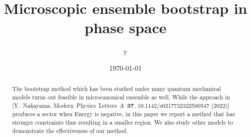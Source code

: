 \documentclass[aps,prl, preprint,amsmath, amssymb]{revtex4-2}
\begin{document}

\title{Microscopic ensemble bootstrap in phase space}


\author{y}


\date{\today}

\begin{abstract}
    The bootstrap method which has been studied under many quantum mechanical models turns out feasible in microcanonical ensemble as well. While the approach in [Y.\ Nakayama, Modern\ Physics\ Letters\ A\ \textbf{37}, 10.1142/s0217732322500547 (2022)] produces a sector when Energy is negative, in this paper we report a method that has stronger constraints thus resulting in a smaller region. We also study other models to demonstrate the effectiveness of our method.
\end{abstract}

\end{document}

